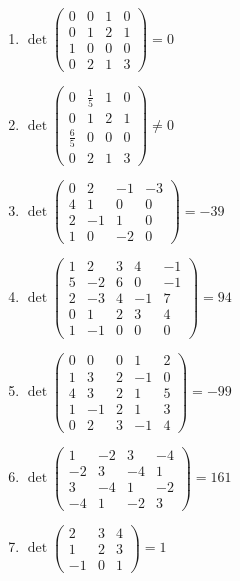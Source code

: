 \documentclass[11pt,a4paper]{article}
\begin{document}
\begin{enumerate}
\item $\displaystyle \det \begin{pmatrix} 0 & 0 & 1 & 0 \\ 0 & 1 & 2 & 1 \\ 1 & 0 & 0 & 0 \\ 0 & 2 & 1 & 3 \end{pmatrix} = 0$
\item $\displaystyle \det \begin{pmatrix} 0 & \frac{1}{5} & 1 & 0 \\ 0 & 1 & 2 & 1 \\ \frac{6}{5} & 0 & 0 & 0 \\ 0 & 2 & 1 & 3 \end{pmatrix} \neq 0$
\item $\displaystyle \det \begin{pmatrix} 0 & 2 & -1 & -3 \\ 4 & 1 & 0 & 0 \\ 2 & -1 & 1 & 0 \\ 1 & 0 & -2 & 0 \end{pmatrix} = -39$
\item $\displaystyle \det \begin{pmatrix} 1 & 2 & 3 & 4 & -1 \\ 5 & -2 & 6 & 0 & -1 \\ 2 & -3 & 4 & -1 & 7 \\ 0 & 1 & 2 & 3 & 4 \\ 1 & -1 & 0 & 0 & 0 \end{pmatrix} = 94$
\item $\displaystyle \det \begin{pmatrix} 0 & 0 & 0 & 1 & 2 \\ 1 & 3 & 2 & -1 & 0 \\ 4 & 3 & 2 & 1 & 5 \\ 1 & -1 & 2 & 1 & 3 \\ 0 & 2 & 3 & -1 & 4 \end{pmatrix} = -99$
\item $\displaystyle \det \begin{pmatrix} 1 & -2 & 3 & -4 \\ -2 & 3 & -4 & 1 \\ 3 & -4 & 1 & -2 \\ -4 & 1 & -2 & 3 \end{pmatrix} = 161$
\item $\displaystyle \det \begin{pmatrix} 2 & 3 & 4 \\ 1 & 2 & 3 \\ -1 & 0 & 1 \end{pmatrix} = 1$

\end{enumerate}
\end{document}
